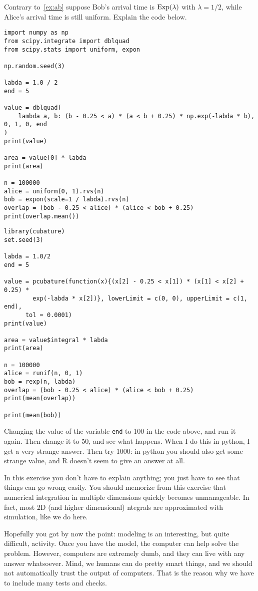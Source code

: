 \begin{exercise}
Contrary to~\cref{ex:ab} suppose Bob's arrival time is $\mathrm{Exp}(\lambda)$ with $\lambda=1/2$,  while Alice's arrival time is still uniform.
Explain the code below.
\begin{verbatim}
import numpy as np
from scipy.integrate import dblquad
from scipy.stats import uniform, expon

np.random.seed(3)

labda = 1.0 / 2
end = 5

value = dblquad(
    lambda a, b: (b - 0.25 < a) * (a < b + 0.25) * np.exp(-labda * b), 0, 1, 0, end
)
print(value)

area = value[0] * labda
print(area)

n = 100000
alice = uniform(0, 1).rvs(n)
bob = expon(scale=1 / labda).rvs(n)
overlap = (bob - 0.25 < alice) * (alice < bob + 0.25)
print(overlap.mean())
\end{verbatim}

\begin{verbatim}
library(cubature)
set.seed(3)

labda = 1.0/2
end = 5

value = pcubature(function(x){(x[2] - 0.25 < x[1]) * (x[1] < x[2] + 0.25) *
        exp(-labda * x[2])}, lowerLimit = c(0, 0), upperLimit = c(1, end),
      tol = 0.0001)
print(value)

area = value$integral * labda
print(area)

n = 100000
alice = runif(n, 0, 1)
bob = rexp(n, labda)
overlap = (bob - 0.25 < alice) * (alice < bob + 0.25)
print(mean(overlap))

print(mean(bob))
\end{verbatim}

\end{exercise}

\begin{exercise}
Changing the value of the variable \verb|end| to 100 in the code above, and run it again. Then change it to 50, and see what happens.  When I do this in python, I get a very strange answer. Then try 1000: in python you should also get some strange value, and R doesn't seem to give an answer at all.

In this exercise you don't have to explain anything; you just have to see that things can go wrong easily. You should memorize from this exercise that numerical integration in multiple dimensions quickly becomes unmanageable. In fact, most 2D (and higher dimensional) ntegrals are approximated with simulation, like we do here.
\end{exercise}


Hopefully you got by now the point: modeling is an interesting, but  quite difficult, activity. Once you have the model, the computer can help solve the problem. However,  computers are extremely dumb, and they can live with any answer whatsoever. Mind, we humans can do pretty smart things, and we should not automatically  trust the output of computers. That is the reason why we have to include many tests and checks.
